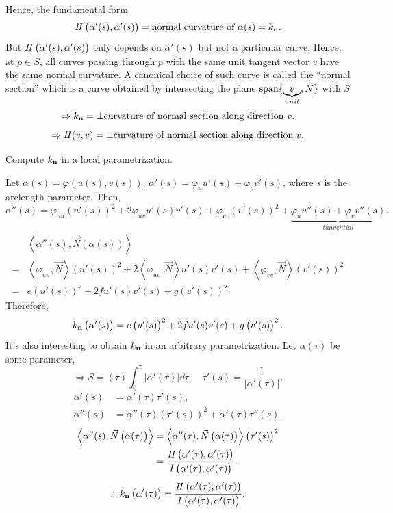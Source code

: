 Hence, the  fundamental form
\[
    I\!I\left(\alpha'(s),\alpha'(s)\right)    
    =\text{normal curvature of }\alpha(s)=k_{\vb{n}}.
\]
But \(I\!I\left(\alpha'(s),\alpha'(s)\right)\) only depends on 
\(\alpha'(s)\) but not a particular curve. Hence, at \(p\in S\), 
all curves passing through \(p\) with the same unit tangent vector
\(v\) have the same normal curvature. A canonical choice of
such curve is called the ``normal section'' which is a curve 
obtained by intersecting the plane \(\operatorname{span}\{\underbrace{v}_{unit},N\}\)
with \(S\)
\[
    \Rightarrow k_{\vb{n}}=\pm \text{curvature of normal section along
    direction }v.
\]
\[
    \Rightarrow I\!I(v,v)= \pm \text{curvature of normal section along
    direction }v.   
\]
\begin{exercise}
    Compute \(k_{\vb{n}}\) in a local parametrization.

    Let \(\alpha(s)=\varphi\left(u(s),v(s)\right)\), 
    \(\alpha'(s)=\varphi_u u'(s)+\varphi_v v'(s)\), where \(s\)
    is the arclength parameter. Then, 
    \[
        \alpha''(s)=\varphi_{uu}\left(u'(s)\right)^2 +2\varphi_{uv}
        u'(s)v'(s)+\varphi_{vv}\left(v'(s)\right)^2
        +\underbrace{\varphi_u u''(s)+\varphi_v v''(s)}_{tangential}.
    \]
    \begin{align*}
        &\left\langle \alpha''(s),
        \vec{N}\left(\alpha(s)\right)\right\rangle\\
        =&\left\langle \varphi_{uu},\vec{N}\right\rangle
        \left(u'(s)\right)^2 +2\left\langle\varphi_{uv},
        \vec{N}\right\rangle u'(s)v'(s)+\left\langle
        \varphi_{vv},\vec{N}\right\rangle\left(v'(s)\right)^2\\
        =&e \left(u'(s)\right)^2+2fu'(s)v'(s)+g\left(v'(s)\right)^2
    .\end{align*}
    Therefore, 
    \[
        k_{\vb{n}}\left(\alpha'(s)\right)=
        e \left(u'(s)\right)^2+2fu'(s)v'(s)+g\left(v'(s)\right)^2.
    \]
    It's also interesting to obtain \(k_{\vb{n}}\) in an 
    arbitrary parametrization. Let \(\alpha(\tau)\) be some parameter,
    \[
        \Rightarrow
        S=\left(\tau\right)    \int_0^\tau \left|\alpha'(\tau)\right|
        \dd \tau
        ,\quad \tau'(s)=\frac{1}{\left|\alpha'(\tau)\right|}.
    \]
    \begin{align*}
        \alpha'(s)&=\alpha'(\tau)\tau'(s),\\
        \alpha''(s)&=\alpha''(\tau)\left(\tau'(s)\right)^2+
        \alpha'(\tau)\tau''(s).
    \end{align*}
    \begin{align*}
        \left\langle\alpha''(s),\vec{N}\left(\alpha(\tau)\right)
        \right\rangle
        &=\left\langle\alpha''(\tau),\vec{N}\left(\alpha(\tau)\right)
        \right\rangle\left(\tau'(s)\right)^2\\
        &=\frac{I\!I\left(\alpha'(\tau),\alpha'(\tau)\right)}{
            I\left(\alpha'(\tau),\alpha'(\tau)\right)
        }.
    \end{align*}
    \[
        \therefore   k_{\vb{n}}\left(\alpha'(\tau)\right)
        =\frac{I\!I\left(\alpha'(\tau),\alpha'(\tau)\right)}{
            I\left(\alpha'(\tau),\alpha'(\tau)\right)
        }.
    \]
\end{exercise}

